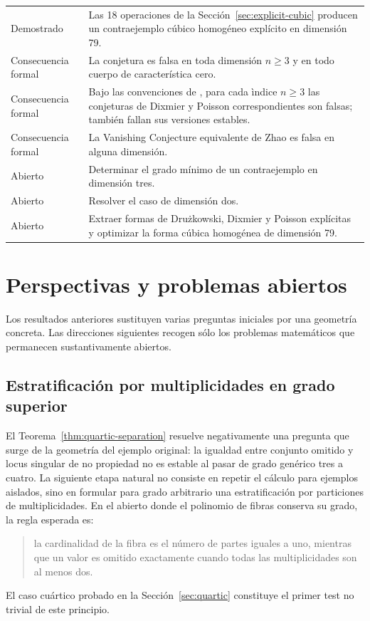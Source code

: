 \documentclass[11pt]{article}
\theoremstyle{definition}
\theoremstyle{remark}
\begin{document}
\begin{center}
\begin{tabular}{@{}p{}p{}@{}}
Demostrado & Las 18 operaciones de la Secci\'on~\ref{sec:explicit-cubic}
producen un contraejemplo c\'ubico homog\'eneo expl\'icito en dimensi\'on 79. \\
Consecuencia formal & La conjetura es falsa en toda dimensi\'on $n\geq3$ y
en todo cuerpo de caracter\'istica cero. \\
Consecuencia formal & Bajo las convenciones de
\cite{AdjamagboVanDenEssen2007}, para cada \`indice $n\geq3$ las conjeturas de
Dixmier y Poisson correspondientes son falsas; tambi\'en fallan sus versiones
estables. \\
Consecuencia formal & La Vanishing Conjecture equivalente de Zhao es falsa en
alguna dimensi\'on. \\
Abierto & Determinar el grado m\'inimo de un contraejemplo en dimensi\'on tres. \\
Abierto & Resolver el caso de dimensi\'on dos. \\
Abierto & Extraer formas de Dru\.zkowski, Dixmier y Poisson expl\'icitas y
optimizar la forma c\'ubica homog\'enea de dimensi\'on 79. \\
\bottomrule
\end{tabular}
\end{center}

\section{Perspectivas y problemas abiertos}

Los resultados anteriores sustituyen varias preguntas iniciales por una
geometr\'ia concreta. Las direcciones siguientes recogen s\'olo los problemas
matem\'aticos que permanecen sustantivamente abiertos.

\subsection{Estratificaci\'on por multiplicidades en grado superior}

El Teorema~\ref{thm:quartic-separation} resuelve negativamente una pregunta
que surge de la geometr\'ia del ejemplo original: la igualdad entre conjunto
omitido y locus singular de no propiedad no es estable al pasar de grado
gen\'erico tres a cuatro. La siguiente etapa natural no consiste en repetir el
c\'alculo para ejemplos aislados, sino en formular para grado arbitrario una
estratificaci\'on por particiones de multiplicidades. En el abierto donde el
polinomio de fibras conserva su grado, la regla esperada es:
\begin{quote}
la cardinalidad de la fibra es el n\'umero de partes iguales a uno, mientras
que un valor es omitido exactamente cuando todas las multiplicidades son al
menos dos.
\end{quote}
El caso cu\'artico probado en la Secci\'on~\ref{sec:quartic} constituye el
primer test no trivial de este principio.
\end{document}
